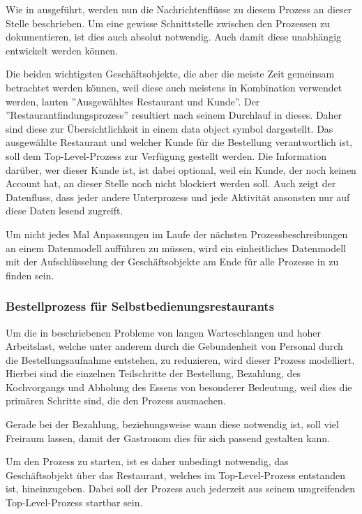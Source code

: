 Wie in  ausgeführt, werden nun die Nachrichtenflüsse zu diesem Prozess an dieser Stelle beschrieben. Um eine gewisse Schnittstelle zwischen den Prozessen zu dokumentieren, ist dies auch absolut notwendig. Auch damit diese unabhängig entwickelt werden können. 

Die beiden wichtigsten Geschäftsobjekte, die aber die meiste Zeit gemeinsam betrachtet werden können, weil diese auch meistens in Kombination verwendet werden, lauten ''Ausgewähltes Restaurant und Kunde''. Der ''Restaurantfindungsprozess'' resultiert nach seinem Durchlauf in dieses. Daher sind diese zur Übersichtlichkeit in einem data object symbol dargestellt. Das ausgewählte Restaurant und welcher Kunde für die Bestellung verantwortlich ist, soll dem Top-Level-Prozess zur Verfügung gestellt werden. Die Information darüber, wer dieser Kunde ist, ist dabei optional, weil ein Kunde, der noch keinen Account hat, an dieser Stelle noch nicht blockiert werden soll. Auch zeigt der Datenfluss, dass jeder andere Unterprozess und jede Aktivität ansonsten nur auf diese Daten lesend zugreift.

Um nicht jedes Mal Anpassungen im Laufe der nächsten Prozessbeschreibungen an einem Datenmodell aufführen zu müssen, wird ein einheitliches Datenmodell mit der Aufschlüsselung der Geschäftsobjekte am Ende für alle Prozesse in  zu finden sein.

\subsubsection{Bestellprozess für Selbstbedienungsrestaurants}
\label{sec:selbstbedienungsrestaurantunterprozess}
Um die in  beschriebenen Probleme von langen Warteschlangen und hoher Arbeitslast, welche unter anderem durch die Gebundenheit von Personal durch die Bestellungsaufnahme entstehen, zu reduzieren, wird dieser Prozess modelliert. Hierbei sind die einzelnen Teilschritte der Bestellung, Bezahlung, des Kochvorgangs und Abholung des Essens von besonderer Bedeutung, weil dies die primären Schritte sind, die den Prozess ausmachen.

Gerade bei der Bezahlung, beziehungsweise wann diese notwendig ist, soll viel Freiraum lassen, damit der Gastronom dies für sich passend gestalten kann.

Um den Prozess zu starten, ist es daher unbedingt notwendig, das Geschäftsobjekt über das Restaurant, welches im Top-Level-Prozess entstanden ist, hineinzugeben. Dabei soll der Prozess auch jederzeit aus seinem umgreifenden Top-Level-Prozess startbar sein.

